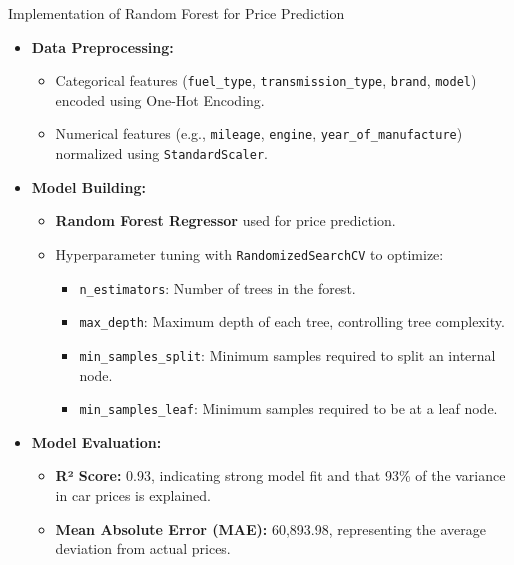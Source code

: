 \documentclass{beamer}
\begin{document}
\begin{frame}{Implementation of Random Forest for Price Prediction}
    \begin{itemize}
        \item \textbf{Data Preprocessing:}
        \begin{itemize}
            \item Categorical features (\texttt{fuel\_type}, \texttt{transmission\_type}, \texttt{brand}, \texttt{model}) encoded using One-Hot Encoding.
            \item Numerical features (e.g., \texttt{mileage}, \texttt{engine}, \texttt{year\_of\_manufacture}) normalized using \texttt{StandardScaler}.
        \end{itemize}
        
        \item \textbf{Model Building:}
        \begin{itemize}
            \item \textbf{Random Forest Regressor} used for price prediction.
            \item Hyperparameter tuning with \texttt{RandomizedSearchCV} to optimize:
            \begin{itemize}
                \item \texttt{n\_estimators}: Number of trees in the forest.
                \item \texttt{max\_depth}: Maximum depth of each tree, controlling tree complexity.
                \item \texttt{min\_samples\_split}: Minimum samples required to split an internal node.
                \item \texttt{min\_samples\_leaf}: Minimum samples required to be at a leaf node.
            \end{itemize}
        \end{itemize}
        
        \item \textbf{Model Evaluation:}
        \begin{itemize}
            \item \textbf{R² Score:} 0.93, indicating strong model fit and that 93\% of the variance in car prices is explained.
            \item \textbf{Mean Absolute Error (MAE):} 60,893.98, representing the average deviation from actual prices.
        \end{itemize}
    \end{itemize}
\end{frame}
\end{document}
